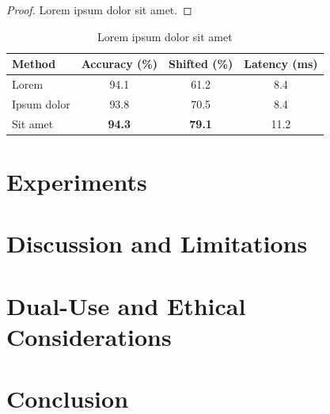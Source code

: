 \documentclass[review]{ml4d}
\begin{document}
\begin{proof}
Lorem ipsum dolor sit amet.
\end{proof}

\begin{table}[t]
  \centering
  \caption{Lorem ipsum dolor sit amet}
  \label{tab:results}
  \footnotesize
  \begin{tabular}{@{}lccc@{}}
    \toprule
    Method & Accuracy (\%) & Shifted (\%) & Latency (ms) \\
    \midrule
    Lorem            & 94.1 & 61.2 & \phantom{0}8.4 \\
    Ipsum dolor      & 93.8 & 70.5 & \phantom{0}8.4 \\
    Sit amet         & \textbf{94.3} & \textbf{79.1} & 11.2 \\
    \bottomrule
  \end{tabular}
\end{table}

\section{Experiments}
\lipsum[1]

\section{Discussion and Limitations}
\lipsum[1]

\section{Dual-Use and Ethical Considerations}
\lipsum[1]

\section{Conclusion}
\lipsum[1]

\end{document}
